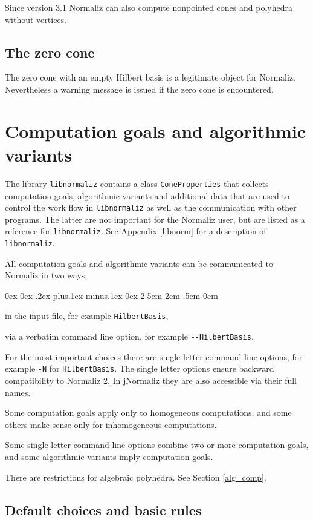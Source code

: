 \documentclass[12pt,a4paper]{scrartcl}
\newcounter{listi}
\newcommand{\stdli}{ \topsep0ex \partopsep0ex %
\parsep.2ex plus.1ex minus.1ex \itemsep0ex%
\leftmargin2.5em \labelwidth2em \labelsep.5em \rightmargin0em}%
\newenvironment{arab}{\begin{list}{\textup{(\arabic{listi})}}%
	{\usecounter{listi}\stdli}}{\end{list}}
\theoremstyle{definition}
\begin{document}
Since version 3.1 Normaliz can also compute nonpointed cones and polyhedra without vertices.

\subsection{The zero cone}\label{zero}

The zero cone with an empty Hilbert basis is a legitimate
object for Normaliz. Nevertheless a warning message is issued
if the zero cone is encountered.

\section{Computation goals and algorithmic variants}\label{Goals}

The library \verb|libnormaliz| contains a class \verb|ConeProperties| that collects computation goals, algorithmic variants and additional data that are used to control the work flow in \verb|libnormaliz| as well as the communication with other programs. The latter are not important for the Normaliz user, but are listed as a reference for \verb|libnormaliz|. See Appendix \ref{libnorm} for a description of \verb|libnormaliz|.

All computation goals and algorithmic variants can be communicated to Normaliz in two ways:
\begin{arab}
	\item in the input file, for example \verb|HilbertBasis|,
	\item via a verbatim command line option, for example \verb|--HilbertBasis|.
\end{arab}
For the most important choices there are single letter command line options, for example \verb|-N| for \verb|HilbertBasis|. The single letter options ensure backward compatibility to Normaliz 2. In jNormaliz they are also accessible via their full names.

Some computation goals apply only to homogeneous computations, and some others make sense only for inhomogeneous computations.

Some single letter command line options combine two or more computation goals, and some algorithmic variants imply computation goals.

There are restrictions for algebraic polyhedra. See Section \ref{alg_comp}.

\subsection{Default choices and basic rules}
\end{document}
